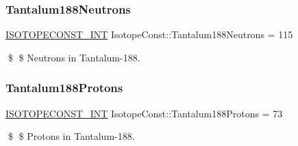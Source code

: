 \subsubsection{\texorpdfstring{Tantalum188\+Neutrons}{Tantalum188Neutrons}}
{\footnotesize\ttfamily \mbox{\hyperlink{group___isotope_const-_macros_ga5f18360b3e99483a35c32d789e62621c}{I\+S\+O\+T\+O\+P\+E\+C\+O\+N\+S\+T\+\_\+\+I\+NT}} Isotope\+Const\+::\+Tantalum188\+Neutrons = 115}

\$ \$ Neutrons in Tantalum-\/188. \mbox{\label{group___isotope_const-_tantalum-_ta188_gab4442b2ecd0aeb4df27671aa385fe9a0}} 
\subsubsection{\texorpdfstring{Tantalum188\+Protons}{Tantalum188Protons}}
{\footnotesize\ttfamily \mbox{\hyperlink{group___isotope_const-_macros_ga5f18360b3e99483a35c32d789e62621c}{I\+S\+O\+T\+O\+P\+E\+C\+O\+N\+S\+T\+\_\+\+I\+NT}} Isotope\+Const\+::\+Tantalum188\+Protons = 73}

\$ \$ Protons in Tantalum-\/188. 